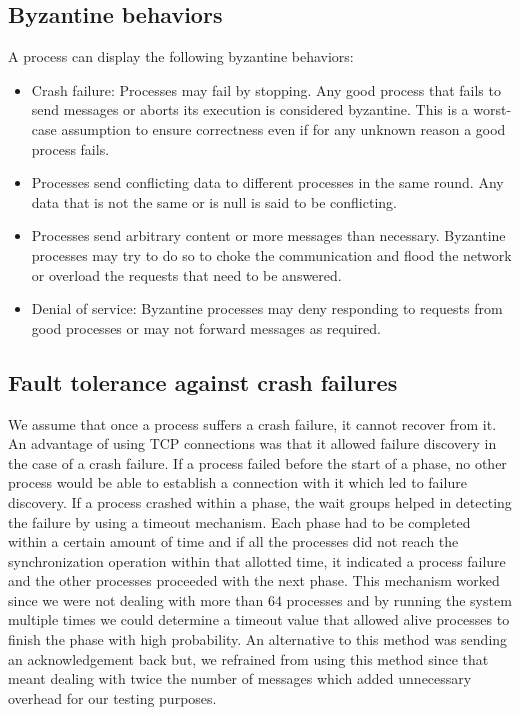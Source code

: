 \subsection{Byzantine behaviors}
\label{sec:behavior}
A process can display the following byzantine behaviors:
\begin{itemize}
    \item Crash failure: Processes may fail by stopping. Any good process that fails to send messages or aborts its execution is considered byzantine. This is a worst-case assumption to ensure correctness even if for any unknown reason a good process fails.
    \item Processes send conflicting data to different processes in the same round. Any data that is not the same or is null is said to be conflicting.
    \item Processes send arbitrary content or more messages than necessary. Byzantine processes may try to do so to choke the communication and flood the network or overload the requests that need to be answered.
    \item Denial of service: Byzantine processes may deny responding to requests from good processes or may not forward messages as required. 
\end{itemize}

\subsection{Fault tolerance against crash failures}
We assume that once a process suffers a crash failure, it cannot recover from it. An advantage of using TCP connections was that it allowed failure discovery in the case of a crash failure. If a process failed before the start of a phase, no other process would be able to establish a connection with it which led to failure discovery. If a process crashed within a phase, the wait groups helped in detecting the failure by using a timeout mechanism. Each phase had to be completed within a certain amount of time and if all the processes did not reach the synchronization operation within that allotted time, it indicated a process failure and the other processes proceeded with the next phase. This mechanism worked since we were not dealing with more than $64$ processes and by running the system multiple times we could determine a timeout value that allowed alive processes to finish the phase with high probability. An alternative to this method was sending an acknowledgement back but, we refrained from using this method since that meant dealing with twice the number of messages which added unnecessary overhead for our testing purposes. 

